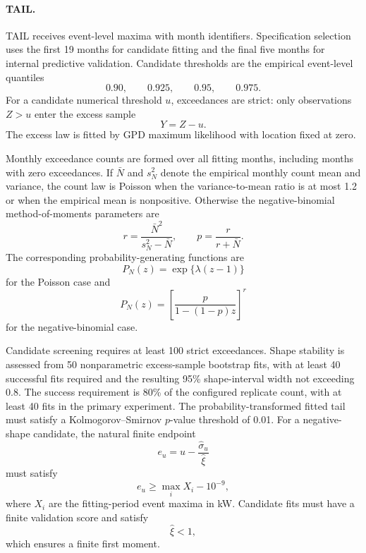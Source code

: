 \documentclass[AMA,Times1COL]{WileyNJDv5}
\begin{document}
\paragraph*{TAIL.}

TAIL receives event-level maxima with month identifiers. Specification
selection uses the first 19 months for candidate fitting and the final
five months for internal predictive validation. Candidate thresholds
are the empirical event-level quantiles
\[
0.90,\qquad
0.925,\qquad
0.95,\qquad
0.975.
\]
For a candidate numerical threshold \(u\), exceedances are strict:
only observations \(Z>u\) enter the excess sample
\[
Y=Z-u.
\]
The excess law is fitted by GPD maximum likelihood with location fixed
at zero.

Monthly exceedance counts are formed over all fitting months,
including months with zero exceedances. If \(\bar N\) and \(s_N^2\)
denote the empirical monthly count mean and variance, the count law is
Poisson when the variance-to-mean ratio is at most 1.2 or when the
empirical mean is nonpositive. Otherwise the negative-binomial
method-of-moments parameters are
\[
r
=
\frac{\bar N^2}{s_N^2-\bar N},
\qquad
p
=
\frac{r}{r+\bar N}.
\]
The corresponding probability-generating functions are
\[
P_N(z)
=
\exp\{\lambda(z-1)\}
\]
for the Poisson case and
\[
P_N(z)
=
\left[
\frac{p}{1-(1-p)z}
\right]^r
\]
for the negative-binomial case.

Candidate screening requires at least 100 strict exceedances.
Shape stability is assessed from 50 nonparametric excess-sample
bootstrap fits, with at least 40 successful fits required and the
resulting 95\% shape-interval width not exceeding 0.8. The
success requirement is 80\% of the configured replicate count,
with at least 40 fits in the primary experiment. The
probability-transformed fitted tail must satisfy a
Kolmogorov--Smirnov \(p\)-value threshold of 0.01. For a negative-shape
candidate, the natural finite endpoint
\[
e_u
=
u-\frac{\widehat\sigma_u}{\widehat\xi}
\]
must satisfy
\[
e_u\geq \max_i X_i-10^{-9},
\]
where \(X_i\) are the fitting-period event maxima in kW. Candidate
fits must have a finite validation score and satisfy
\[
\widehat\xi<1,
\]
which ensures a finite first moment.
\end{document}
